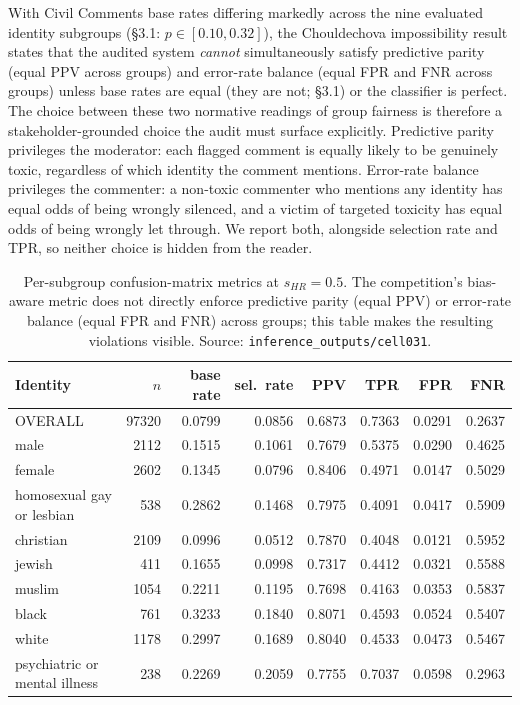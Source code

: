 \documentclass[11pt]{article}
\begin{document}
With Civil Comments base rates differing markedly across the nine evaluated identity subgroups (\S3.1: $p \in [0.10, 0.32]$), the Chouldechova impossibility result \citep{chouldechova2017fair} states that the audited system \emph{cannot} simultaneously satisfy predictive parity (equal PPV across groups) and error-rate balance (equal FPR and FNR across groups) unless base rates are equal (they are not; \S3.1) or the classifier is perfect. The choice between these two normative readings of group fairness is therefore a stakeholder-grounded choice the audit must surface explicitly. Predictive parity privileges the moderator: each flagged comment is equally likely to be genuinely toxic, regardless of which identity the comment mentions. Error-rate balance privileges the commenter: a non-toxic commenter who mentions any identity has equal odds of being wrongly silenced, and a victim of targeted toxicity has equal odds of being wrongly let through. We report both, alongside selection rate and TPR, so neither choice is hidden from the reader.

\begin{table}[h]
\centering
\small
\setlength{\tabcolsep}{4pt}
\begin{tabular}{lrrrrrrr}
\toprule
Identity & $n$ & base rate & sel.\ rate & PPV & TPR & FPR & FNR \\
\midrule
OVERALL                       & 97320 & 0.0799 & 0.0856 & 0.6873 & 0.7363 & 0.0291 & 0.2637 \\
male                          &  2112 & 0.1515 & 0.1061 & 0.7679 & 0.5375 & 0.0290 & 0.4625 \\
female                        &  2602 & 0.1345 & 0.0796 & 0.8406 & 0.4971 & 0.0147 & 0.5029 \\
homosexual gay or lesbian     &   538 & 0.2862 & 0.1468 & 0.7975 & 0.4091 & 0.0417 & 0.5909 \\
christian                     &  2109 & 0.0996 & 0.0512 & 0.7870 & 0.4048 & 0.0121 & 0.5952 \\
jewish                        &   411 & 0.1655 & 0.0998 & 0.7317 & 0.4412 & 0.0321 & 0.5588 \\
muslim                        &  1054 & 0.2211 & 0.1195 & 0.7698 & 0.4163 & 0.0353 & 0.5837 \\
black                         &   761 & 0.3233 & 0.1840 & 0.8071 & 0.4593 & 0.0524 & 0.5407 \\
white                         &  1178 & 0.2997 & 0.1689 & 0.8040 & 0.4533 & 0.0473 & 0.5467 \\
psychiatric or mental illness &   238 & 0.2269 & 0.2059 & 0.7755 & 0.7037 & 0.0598 & 0.2963 \\
\bottomrule
\end{tabular}
\caption{Per-subgroup confusion-matrix metrics at $s_{HR} = 0.5$. The competition's bias-aware metric does not directly enforce predictive parity (equal PPV) or error-rate balance (equal FPR and FNR) across groups; this table makes the resulting violations visible. Source: \texttt{inference\_outputs/cell031}.}
\end{table}
\end{document}
